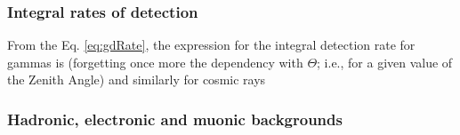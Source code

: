 \subsubsection{Integral rates of detection}

From the Eq. \ref{eq:gdRate}, the expression for the integral
detection rate for gammas is (forgetting once more the dependency with
$\Theta$; i.e., for a given value of the Zenith Angle)
%
\gRateeq
%
and similarly for cosmic rays
%
\crRateeq


\subsubsection{Hadronic, electronic and muonic backgrounds}


\randpoifig



\endinput
%

%
%
%


